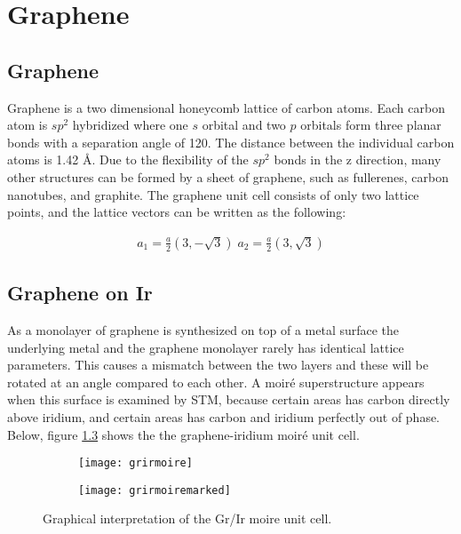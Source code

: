 \chapter{Graphene}

\section{Graphene}

Graphene is a two dimensional honeycomb lattice of carbon atoms. Each carbon atom is $sp^2$ hybridized where one $s$ orbital and two $p$ orbitals form three planar bonds with a separation angle of 120\degree. The distance between the individual carbon atoms is 1.42 Å. Due to the flexibility of the $sp^2$ bonds in the z direction, many other structures can be formed by a sheet of graphene, such as fullerenes, carbon nanotubes, and graphite. The graphene unit cell consists of only two lattice points, and the lattice vectors can be written as the following:

\begin{align*}
  a_1 = \frac{a}{2}(3,-\sqrt{3}) \; a_2 = \frac{a}{2}(3,\sqrt{3})
\end{align*}

\section{Graphene on Ir}

As a monolayer of graphene is synthesized on top of a metal surface the underlying metal and the graphene monolayer rarely has identical lattice parameters. This causes a mismatch between the two layers and these will be rotated at an angle compared to each other. A moiré superstructure appears when this surface is examined by STM, because certain areas has carbon directly above iridium, and certain areas has carbon and iridium perfectly out of phase. Below, figure \ref{moireunitcell} shows the the graphene-iridium moiré unit cell.

\begin{figure}
  \centering
  \begin{subfigure}[b]{0.3\textwidth}
       \texttt{[image: grirmoire]}
       \caption{}
       \label{fig:unmarked}
   \end{subfigure}
   \begin{subfigure}[b]{0.3\textwidth}
        \texttt{[image: grirmoiremarked]}
        \caption{}
        \label{fig:marked}
    \end{subfigure}
  \caption{Graphical interpretation of the Gr/Ir moire unit cell. \cite{Line}}
  \label{moireunitcell}
\end{figure}



